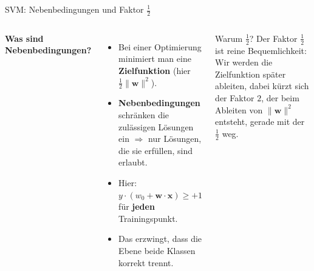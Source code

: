 \begin{frame}{SVM: Nebenbedingungen und Faktor $\tfrac{1}{2}$}
\begin{columns}


\textbf{Was sind Nebenbedingungen?}
\begin{itemize}
  \item Bei einer Optimierung minimiert man eine \textbf{Zielfunktion}
        (hier $\tfrac{1}{2}\lVert\mathbf{w}\rVert^2$).
  \item \textbf{Nebenbedingungen} schränken die zulässigen Lösungen ein $\Rightarrow$
        nur Lösungen, die sie erfüllen, sind erlaubt.
  \item Hier: $y \cdot (w_0 + \mathbf{w}\cdot\mathbf{x}) \geq +1$ für
        \textbf{jeden} Trainingspunkt.
  \item Das erzwingt, dass die Ebene beide Klassen korrekt trennt.
\end{itemize}

\begin{blockC1}{Warum $\tfrac{1}{2}$?}
Der Faktor $\tfrac{1}{2}$ ist reine Bequemlichkeit: Wir werden die Zielfunktion später ableiten, dabei kürzt sich der Faktor $2$, der beim Ableiten von $\lVert\mathbf{w}\rVert^2$ entsteht, gerade mit der $\tfrac{1}{2}$ weg.
\end{blockC1}
\end{columns}
\end{frame}




